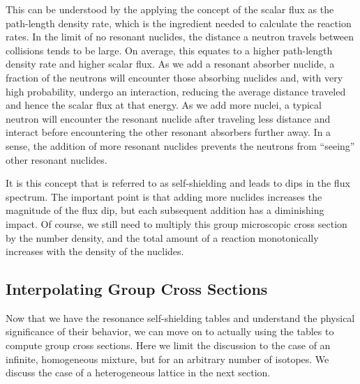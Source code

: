 This can be understood by the applying the concept of the scalar flux as the path-length density rate, which is the ingredient needed to calculate the reaction rates. In the limit of no resonant nuclides, the distance a neutron travels between collisions tends to be large. On average, this equates to a higher path-length density rate and higher scalar flux. As we add a resonant absorber nuclide, a fraction of the neutrons will encounter those absorbing nuclides and, with very high probability, undergo an interaction, reducing the average distance traveled and hence the scalar flux at that energy. As we add more nuclei, a typical neutron will encounter the resonant nuclide after traveling less distance and interact before encountering the other resonant absorbers further away. In a sense, the addition of more resonant nuclides prevents the neutrons from ``seeing'' other resonant nuclides. 

It is this concept that is referred to as self-shielding and leads to dips in the flux spectrum. The important point is that adding more nuclides increases the magnitude of the flux dip, but each subsequent addition has a diminishing impact. Of course, we still need to multiply this group microscopic cross section by the number density, and the total amount of a reaction monotonically increases with the density of the nuclides.

\subsection{Interpolating Group Cross Sections}

Now that we have the resonance self-shielding tables and understand the physical significance of their behavior, we can move on to actually using the tables to compute group cross sections. Here we limit the discussion to the case of an infinite, homogeneous mixture, but for an arbitrary number of isotopes. We discuss the case of a heterogeneous lattice in the next section.

